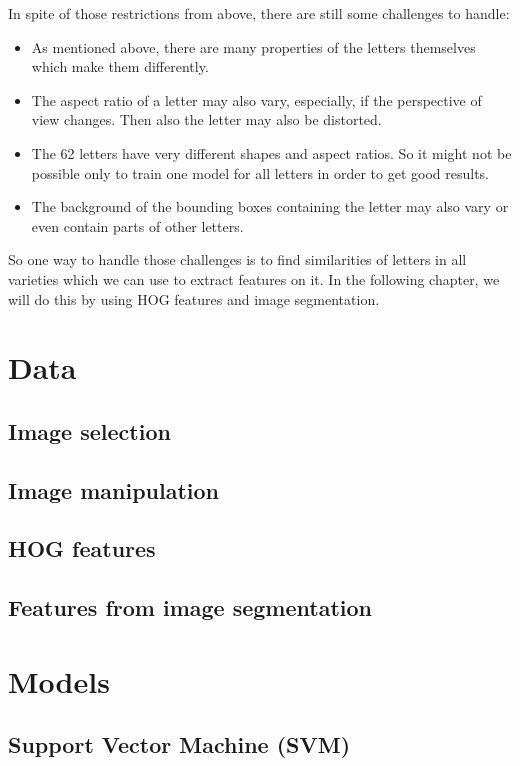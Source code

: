 \documentclass[conference]{IEEEtran}
\begin{document}
In spite of those restrictions from above, there are still some challenges to handle:
\begin{itemize}
\item As mentioned above, there are many properties of the letters themselves which make them differently.
\item The aspect ratio of a letter may also vary, especially, if the perspective of view changes. Then also the letter may also be distorted.
\item The 62 letters have very different shapes and aspect ratios. So it might not be possible only to train one model for all letters in order to get good results.
\item The background of the bounding boxes containing the letter may also vary or even contain parts of other letters.
\end{itemize}
So one way to handle those challenges is to find similarities of letters in all varieties which we can use to extract features on it. In the following chapter, we will do this by using HOG features and image segmentation.

\section{Data}

\subsection{Image selection}

\subsection{Image manipulation}

\subsection{HOG features}

\subsection{Features from image segmentation}

\section{Models}

\subsection{Support Vector Machine (SVM)}
\end{document}
